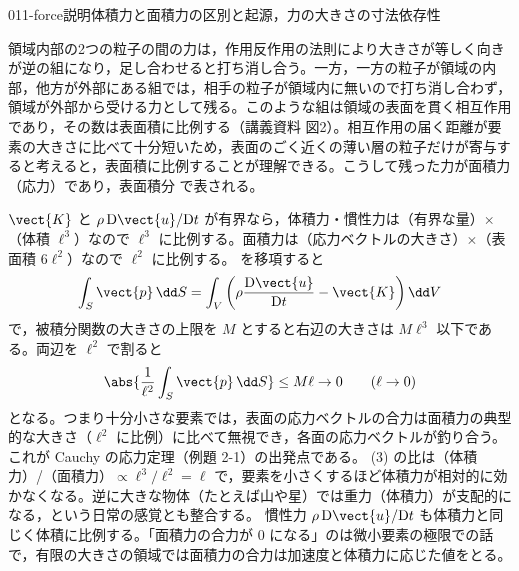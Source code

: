 \documentclass[uplatex,dvipdfmx,a4paper,11pt]{jsarticle}
\begin{document}
\begin{mondai}{011-force}{説明}{体積力と面積力の区別と起源，力の大きさの寸法依存性}
\begin{tadashii}
 領域内部の2つの粒子の間の力は，作用反作用の法則により大きさが等しく向きが逆の組になり，足し合わせると打ち消し合う。一方，一方の粒子が領域の内部，他方が外部にある組では，相手の粒子が領域内に無いので打ち消し合わず，領域が外部から受ける力として残る。このような組は領域の表面を貫く相互作用であり，その数は表面積に比例する（講義資料 図2）。\hanigai 相互作用の届く距離が要素の大きさに比べて十分短いため，表面のごく近くの薄い層の粒子だけが寄与すると考えると，表面積に比例することが理解できる。こうして残った力が面積力（応力）であり，表面積分  で表される。

 $\vect{K}$ と $\rho\,\mathrm{D}\vect{u}/\mathrm{D}t$ が有界なら，体積力・慣性力は（有界な量）$\times$（体積 $\ell^{3}$）なので $\ell^{3}$ に比例する。面積力は（応力ベクトルの大きさ）$\times$（表面積 $6\ell^{2}$）なので $\ell^{2}$ に比例する。 を移項すると
\[ \int_S \vect{p}\,\dd S=\int_V\left(\rho\frac{\mathrm{D}\vect{u}}{\mathrm{D}t}-\vect{K}\right)\dd V \]
で，被積分関数の大きさの上限を $M$ とすると右辺の大きさは $M\ell^{3}$ 以下である。両辺を $\ell^{2}$ で割ると
\[ \abs{\frac{1}{\ell^{2}}\int_S \vect{p}\,\dd S}\le M\ell\to0\qquad(\ell\to0) \]
となる。つまり十分小さな要素では，表面の応力ベクトルの合力は面積力の典型的な大きさ（$\ell^{2}$ に比例）に比べて無視でき，各面の応力ベクトルが釣り合う。これが Cauchy の応力定理（例題 2-1）の出発点である。
\kenzan (3) の比は（体積力）/（面積力）$\propto\ell^{3}/\ell^{2}=\ell$ で，要素を小さくするほど体積力が相対的に効かなくなる。逆に大きな物体（たとえば山や星）では重力（体積力）が支配的になる，という日常の感覚とも整合する。
\tsumazuki 慣性力 $\rho\,\mathrm{D}\vect{u}/\mathrm{D}t$ も体積力と同じく体積に比例する。「面積力の合力が $0$ になる」のは微小要素の極限での話で，有限の大きさの領域では面積力の合力は加速度と体積力に応じた値をとる。
\end{tadashii}
\end{mondai}
\end{document}
